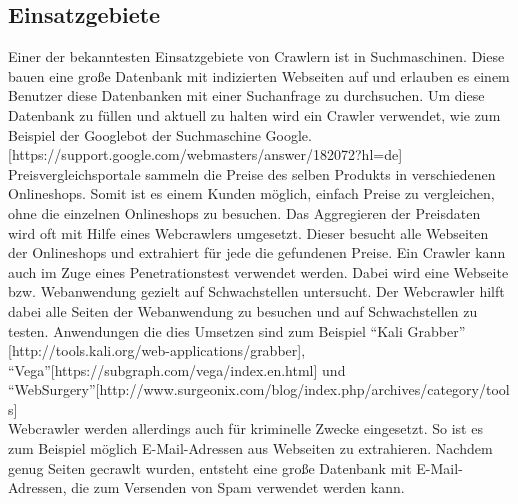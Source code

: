 \subsection{Einsatzgebiete}
Einer der bekanntesten Einsatzgebiete von Crawlern ist in Suchmaschinen. Diese bauen eine große Datenbank mit indizierten Webseiten auf und erlauben es einem Benutzer diese Datenbanken mit einer Suchanfrage zu durchsuchen. Um diese Datenbank zu füllen und aktuell zu halten wird ein Crawler verwendet, wie zum Beispiel der Googlebot der Suchmaschine Google.  [https://support.google.com/webmasters/answer/182072?hl=de] \\
Preisvergleichsportale sammeln die Preise des selben Produkts in verschiedenen Onlineshops. Somit ist es einem Kunden möglich, einfach Preise zu vergleichen, ohne die einzelnen Onlineshops zu besuchen. Das Aggregieren der Preisdaten wird oft mit Hilfe eines Webcrawlers umgesetzt. Dieser besucht alle Webseiten der Onlineshops und extrahiert für jede die gefundenen Preise. 
Ein Crawler kann auch im Zuge eines Penetrationstest verwendet werden. Dabei wird eine Webseite bzw. Webanwendung gezielt auf Schwachstellen untersucht. Der Webcrawler hilft dabei alle Seiten der Webanwendung zu besuchen und auf Schwachstellen zu testen. Anwendungen die dies Umsetzen sind zum Beispiel \enquote{Kali Grabber} [http://tools.kali.org/web-applications/grabber], \enquote{Vega}[https://subgraph.com/vega/index.en.html] und \enquote{WebSurgery}[http://www.surgeonix.com/blog/index.php/archives/category/tools] \\
Webcrawler werden allerdings auch für kriminelle Zwecke eingesetzt. So ist es zum Beispiel möglich E-Mail-Adressen aus Webseiten zu extrahieren. Nachdem genug Seiten gecrawlt wurden, entsteht eine große Datenbank mit E-Mail-Adressen, die zum Versenden von Spam verwendet werden kann. \\
